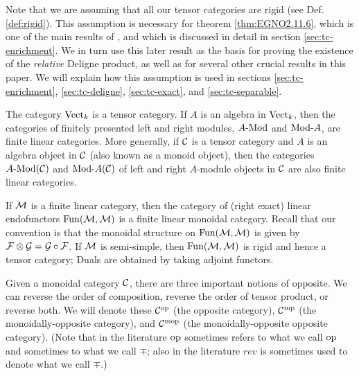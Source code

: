\documentclass{amsart}
\begin{document}
\noindent Note that we are assuming that all our tensor categories are rigid (see Def. \ref{def:rigid}). This assumption is necessary for theorem \ref{thm:EGNO2.11.6}, which is one of the main results of \cite{EGNO}, and which is discussed in detail in section \ref{sec:tc-enrichment}. We in turn use this later result as the basis for proving the existence of the {\em relative} Deligne product, as well as for several other crucial results in this paper. We will explain how this assumption is used in sections \ref{sec:tc-enrichment}, \ref{sec:tc-deligne}, \ref{sec:tc-exact}, and \ref{sec:tc-separable}.

\begin{example}
	The category $\mathrm{Vect}_k$ is a tensor category. If $A$ is an algebra in $\mathrm{Vect}_k$, then the categories of finitely presented left and right modules, $\Mod{A}{}$ and $\Mod{}{A}$, are finite linear categories. More generally, if $\mathcal C$ is a tensor category and $A$ is an algebra object in $\mathcal C$ (also known as a monoid object), then the categories $\Mod{A}{}(\cC)$ and $\Mod{}{A}(\cC)$ of left and right $A$-module objects in $\mathcal C$ are also finite linear categories.
\end{example}

\begin{example}
	If $\mathcal M$ is a finite linear category, then the category of (right exact) linear endofunctors $\operatorname{Fun}(\mathcal M, \mathcal M)$ is a finite linear monoidal category. Recall that our convention is that the monoidal structure on $\operatorname{Fun}(\mathcal M, \mathcal M)$ is given by $\mathcal F \otimes \mathcal G = \mathcal G \circ \mathcal F$. If $\mathcal M$ is semi-simple, then $\operatorname{Fun}(\mathcal M, \mathcal M)$ is rigid and hence a tensor category; Duals are obtained by taking adjoint functors.  
\end{example}

Given a monoidal category $\mathcal C$, there are three important notions of opposite. We can reverse the order of composition, reverse the order of tensor product, or reverse both.  We will denote these $\mathcal C^{\mathrm{op}}$ (the opposite category), $\mathcal C^{\mathrm{mp}}$ (the monoidally-opposite category), and $\mathcal C^{\mathrm{mop}}$ (the monoidally-opposite opposite category).  (Note that in the literature $\mathrm{op}$ sometimes refers to what we call $\mathrm{op}$ and sometimes to what we call $\mp$; also in the literature $rev$ is sometimes used to denote what we call $\mp$.)
\end{document}

